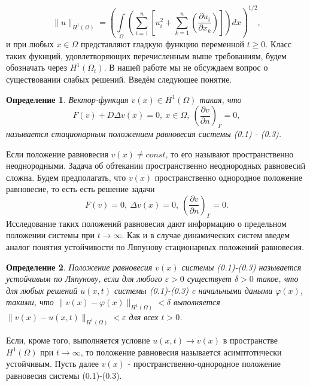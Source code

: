 \documentclass[9pt, a4paper]{extarticle}
\newtheorem{definition}{Определение}
\numberwithin{equation}{section}
\numberwithin{lemma}{section}
\numberwithin{definition}{section}
\numberwithin{notabene}{section}
\numberwithin{corollary}{section}
\begin{document}
	\begin{equation*}
		\|u\|_{H^1(\Omega)} = \left( \int\limits_{\Omega} \left(\sum\limits_{i=1}^{n} \left[u_i^2+\sum\limits_{k=1}^{n} \left(\dfrac{\partial u_i}{\partial x_k}\right)\right]\right) dx\right)^{1/2}, 
	\end{equation*}
	и при любых $x \in \Omega$ представляют гладкую функцию переменной $t \geq 0$.\newline
	Класс таких фукнций, удовлетворяющих перечисленным выше требованиям, будем обозначать через $H^1(\Omega_t)$. В нашей работе мы не обсуждаем вопрос о существовании слабых решений. \newline
	Введём следующее понятие.
	\begin{definition}
		Вектор-функция $v(x) \in H^1(\Omega)$ такая, что 
		\begin{equation}
			F(v) + D \Delta v(x) = 0, \ x \in \Omega, \ \left(\dfrac{\partial v}{\partial n}\right)_\Gamma = 0, 
		\end{equation}
		называется стационарным положением равновесия системы (0.1) - (0.3).
	\end{definition}
	Если положение равновесия $v(x) \neq const$, то его называют пространственно неоднородными. Задача об обтекании пространственно неоднородных равновесий сложна. Будем предполагать, что $v(x)$ пространственно однородное положение равновесие, то есть есть решение задачи
	\begin{equation*}
		F(v) = 0, \ \Delta v(x) = 0, \ \left(\dfrac{\partial v}{\partial n}\right)_\Gamma = 0.
	\end{equation*}
	Исследование таких положений равновесия дают информацию о предельном положении системы при $t \to \infty$. Как и в случае динамических систем введем аналог понятия устойчивости по Ляпунову стационарных положений равновесия.
	\begin{definition}
		Положение равновесия $v(x)$ системы (0.1)-(0.3) называется устойчивым по Ляпунову, если для любого $\varepsilon > 0$ существует $\delta > 0$ такое, что для любых решений $u(x,t)$ системы (0.1)-(0.3) c начальными даными $\varphi(x)$, такими, что $\|v(x) - \varphi(x)\|_{H^1(\Omega)} < \delta$ выполняется $\|v(x) - u(x,t)\|_{H^1(\Omega)} < \varepsilon$ для всех $t > 0$.
	\end{definition}
	Если, кроме того, выполняется условие $u(x,t) \to v(x)$ в пространстве $H^1(\Omega)$ при $t \to \infty$, то положение равновесия называется асимптотически устойчивым.\newline
	Пусть далее $v(x)$ - пространственно-однородное положение равновесия системы (0.1)-(0.3). \newline
\end{document}
